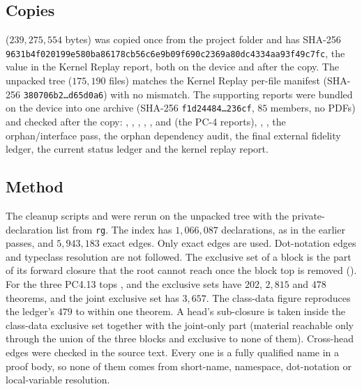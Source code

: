 \documentclass[11pt]{article}
\theoremstyle{remark}
\begin{document}
\subsection{Copies}
 ($239{,}275{,}554$ bytes) was copied once from the project folder and has SHA-256 \texttt{9631b4f020199e58\allowbreak 0ba86178cb56c6e9\allowbreak b09f690c2369a80d\allowbreak c4334aa93f49c7fc}, the value in the Kernel Replay report, both on the device and after the copy. The unpacked tree ($175{,}190$ files) matches the Kernel Replay per-file manifest  (SHA-256 \texttt{380706b2\ldots d65d0a6}) with no mismatch. The supporting reports were bundled on the device into one archive  (SHA-256 \texttt{f1d24484\ldots 236cf}, $85$ members, no PDFs) and checked after the copy: , , , , ,  and  (the PC-4 reports), , , the orphan/interface pass, the orphan dependency audit, the final external fidelity ledger, the current status ledger and the kernel replay report.

\subsection{Method}
The cleanup scripts  and  were rerun on the unpacked tree with the private-declaration list from \texttt{rg}. The index has $1{,}066{,}087$ declarations, as in the earlier passes, and $5{,}943{,}183$ exact edges. Only exact edges are used. Dot-notation edges and typeclass resolution are not followed. The exclusive set of a block is the part of its forward closure that the root  cannot reach once the block top is removed (). For the three PC4.13 tops ,  and  the exclusive sets have $202$, $2{,}815$ and $478$ theorems, and the joint exclusive set has $3{,}657$. The class-data figure reproduces the ledger's $479$ to within one theorem. A head's sub-closure is taken inside the class-data exclusive set together with the joint-only part (material reachable only through the union of the three blocks and exclusive to none of them). Cross-head edges were checked in the source text. Every one is a fully qualified name in a proof body, so none of them comes from short-name, namespace, dot-notation or local-variable resolution.
\end{document}

